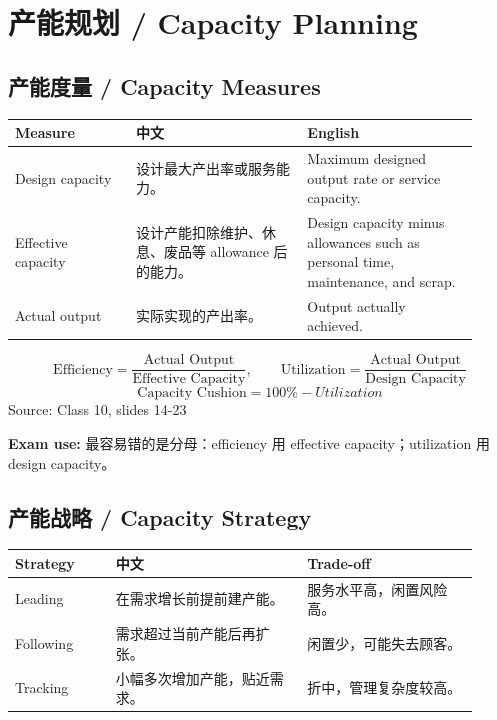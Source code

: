 \documentclass[10pt,a4paper]{ctexart}
\newcommand{\source}[1]{\textcolor{Muted}{\footnotesize Source: #1}}
\newcommand{\exam}[1]{\textcolor{Amber}{\textbf{Exam use:} #1}}
\begin{document}
\section{产能规划 / Capacity Planning}
\label{sec:capacity}

\subsection{产能度量 / Capacity Measures}
\label{subsec:cap-measures}

\begin{longtable}{@{}L{0.24\linewidth}L{0.34\linewidth}L{0.34\linewidth}@{}}
\toprule
\textbf{Measure} & \textbf{中文} & \textbf{English} \\
\midrule
Design capacity & 设计最大产出率或服务能力。 & Maximum designed output rate or service capacity. \\
Effective capacity & 设计产能扣除维护、休息、废品等 allowance 后的能力。 & Design capacity minus allowances such as personal time, maintenance, and scrap. \\
Actual output & 实际实现的产出率。 & Output actually achieved. \\
\bottomrule
\end{longtable}

\[
\text{Efficiency}=\frac{\text{Actual Output}}{\text{Effective Capacity}},
\qquad
\text{Utilization}=\frac{\text{Actual Output}}{\text{Design Capacity}}
\]
\[
\text{Capacity Cushion}=100\%-Utilization
\]
\source{Class 10, slides 14-23}

\exam{最容易错的是分母：efficiency 用 effective capacity；utilization 用 design capacity。}

\subsection{产能战略 / Capacity Strategy}
\label{subsec:cap-strategy}

\begin{longtable}{@{}L{0.20\linewidth}L{0.38\linewidth}L{0.34\linewidth}@{}}
\toprule
\textbf{Strategy} & \textbf{中文} & \textbf{Trade-off} \\
\midrule
Leading & 在需求增长前提前建产能。 & 服务水平高，闲置风险高。 \\
Following & 需求超过当前产能后再扩张。 & 闲置少，可能失去顾客。 \\
Tracking & 小幅多次增加产能，贴近需求。 & 折中，管理复杂度较高。 \\
\bottomrule
\end{longtable}
\end{document}
